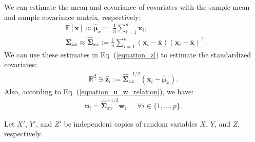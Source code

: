 \documentclass[lang=cn,10pt]{gorgeousnbook}
\numberwithin{equation}{section}%
\numberwithin{figure}{section}%
\begin{document}
We can estimate the mean and covariance of covariates with the sample mean and sample covariance matrix, respectively:
\begin{align}
& \mathbb{E}[\boldsymbol{x}] \approx \widehat{\boldsymbol{\mu}}_x := \frac{1}{n} \sum_{i=1}^n \boldsymbol{x}_i, \label{equation_sample_mean} \\
& \boldsymbol{\Sigma}_{xx} \approx \widehat{\boldsymbol{\Sigma}}_{xx} := \frac{1}{n} \sum_{i=1}^n (\boldsymbol{x}_i - \bar{\boldsymbol{x}}) (\boldsymbol{x}_i - \bar{\boldsymbol{x}})^\top. \label{equation_sample_covariance}
\end{align}
We can use these estimates in Eq. (\ref{equation_z}) to estimate the standardized covariates:
\begin{align}\label{equation_z_i_hat}
\mathbb{R}^{d} \ni \widehat{\boldsymbol{z}}_i := \widehat{\boldsymbol{\Sigma}}_{xx}^{-1/2} (\boldsymbol{x}_i - \widehat{\boldsymbol{\mu}}_x).
\end{align}
Also, according to Eq. (\ref{equation_u_w_relation}), we have:
\begin{align}\label{equation_u_w_relation_estimate}
\boldsymbol{u}_i = \widehat{\boldsymbol{\Sigma}}_{xx}^{-1/2} \boldsymbol{w}_i, \quad \forall i \in \{1, \dots, p\}.
\end{align}

Let $X'$, $Y'$, and $Z'$ be independent copies of random variables $X$, $Y$, and $Z$, respectively. 
\end{document}

